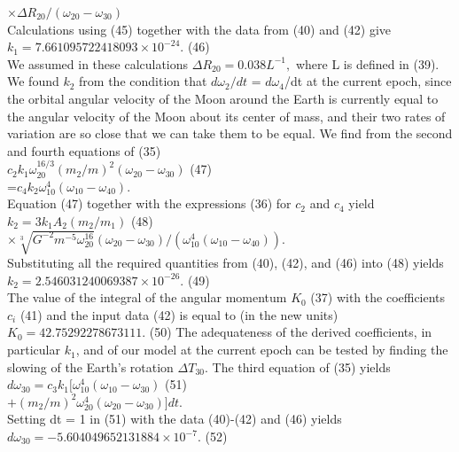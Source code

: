 \documentclass[fontsize = 11pt,a4paper]{article}
\begin{document}
\begin{multicols}{2}
$\times  \Delta R_{20} / (\omega_{20} - \omega_{30})$\\
Calculations using (45) together with the data from
(40) and (42) give\\
$k_1 = 7.661095722418093 \times {10}^{-24}.$ \hfill (46) \\
We assumed in these calculations $ \Delta R_{20} =0.038 L^{-1},$
where L is defined in (39).\\
\indent We found $k_2$ from the condition that $d\omega_2/dt$ =
$d\omega_4$/dt at the current epoch, since the orbital angular
velocity of the Moon around the Earth is currently
equal to the angular velocity of the Moon about its
center of mass, and their two rates of variation are so
close that we can take them to be equal. We find from
the second and fourth equations of (35) \\
$c_2 k_1 \omega^{16/3}_{20} {(m_2/m)}^2 (\omega_{20} - \omega_{30})$ \hfill (47) \\
=$c_4 k_2 \omega^{4}_{10} (\omega_{10} - \omega_{40}).$\\
Equation (47) together with the expressions (36) for
$c_2$ and $c_4$ yield\\
$k_2 = 3 k_1 A_2 (m_2/m_1)$ \hfill (48)\\
$\times  \sqrt[3]{G^{-2} m^{-5} \omega^{16}_{20}}  (\omega_{20} - \omega_{30}) / ( \omega^4_{10}  (\omega_{10} - \omega_{40})).$\\
Substituting all the required quantities from (40),
(42), and (46) into (48) yields\\
$k_2 = 2.546031240069387 \times 10^{-26}.$ \hfill (49)\\
The value of the integral of the angular momentum
$K_0$ (37) with the coefficients $c_i$ (41) and the input
data (42) is equal to (in the new units)\\
$K_0 = 42.75292278673111.$  \hfill (50)
\indent The adequateness of the derived coefficients, in
particular $k_1$, and of our model at the current epoch
can be tested by finding the slowing of the Earth’s
rotation $\Delta T_{30}$. The third equation of (35) yields\\
$d \omega_{30} = c_3 k_1 [ \omega^4_{10} (\omega_{10} - \omega_{30})$ \hfill (51)\\
$+ {(m_2/m)}^2 \omega^4_{20} (\omega_{20} - \omega_{30})]dt.$\\
Setting dt = 1 in (51) with the data (40)-(42) and
(46) yields\\
$d \omega_{30} = -5.604049652131884 \times {10}^{-7}.$ \hfill (52)\\

\end{multicols}
\end{document}
